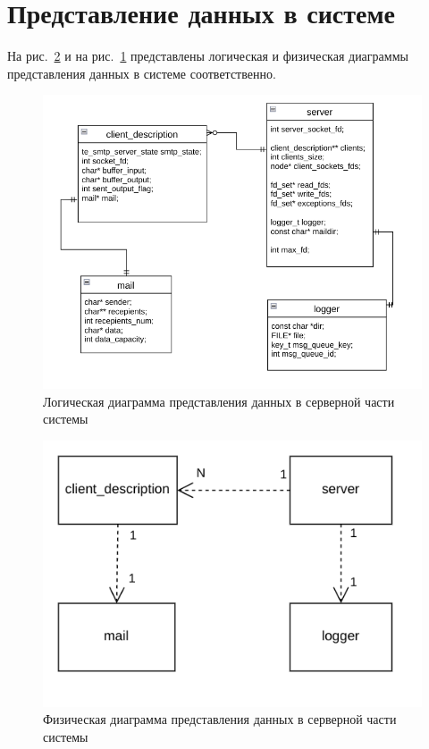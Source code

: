 \documentclass[a4paper,12pt]{report}
\begin{document}
\section{Представление данных в системе}
На рис.~\ref{fig:uml_server_ph} и на рис.~\ref{fig:uml_server_log} представлены логическая и физическая
диаграммы представления данных в системе соответственно.


\begin{figure}
    \centering
    \includegraphics[width=\textwidth]{../images/uml_server_log.png}
    \caption{Логическая диаграмма представления данных в серверной части системы}
    \label{fig:uml_server_log}
\end{figure}

\begin{figure}
    \centering
    \includegraphics[width=\textwidth]{../images/uml_server_ph.png}
    \caption{Физическая диаграмма представления данных в серверной части системы}
    \label{fig:uml_server_ph}
\end{figure}
\end{document}
